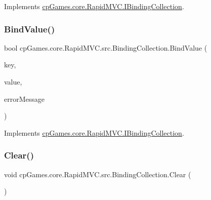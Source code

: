 Implements \mbox{\hyperlink{interfacecp_games_1_1core_1_1_rapid_m_v_c_1_1_i_binding_collection_afff4c2ad2ff9fb25c906864bc28f036f}{cp\+Games.\+core.\+Rapid\+M\+V\+C.\+I\+Binding\+Collection}}.

\mbox{\label{classcp_games_1_1core_1_1_rapid_m_v_c_1_1src_1_1_binding_collection_afb78998cb899e8a918b654505d521f7b}} 
\subsubsection{\texorpdfstring{BindValue()}{BindValue()}}
{\footnotesize\ttfamily bool cp\+Games.\+core.\+Rapid\+M\+V\+C.\+src.\+Binding\+Collection.\+Bind\+Value (\begin{DoxyParamCaption}\item[{\mbox{\hyperlink{interfacecp_games_1_1core_1_1_rapid_m_v_c_1_1_i_binding_key}{I\+Binding\+Key}}}]{key,  }\item[{object}]{value,  }\item[{out string}]{error\+Message }\end{DoxyParamCaption})}



Implements \mbox{\hyperlink{interfacecp_games_1_1core_1_1_rapid_m_v_c_1_1_i_binding_collection_a2a468c5570b780133763d9592e2c1cb5}{cp\+Games.\+core.\+Rapid\+M\+V\+C.\+I\+Binding\+Collection}}.

\mbox{\label{classcp_games_1_1core_1_1_rapid_m_v_c_1_1src_1_1_binding_collection_a7c3b2155a17bdb3f1d94a1e003fbb3c7}} 
\subsubsection{\texorpdfstring{Clear()}{Clear()}}
{\footnotesize\ttfamily void cp\+Games.\+core.\+Rapid\+M\+V\+C.\+src.\+Binding\+Collection.\+Clear (\begin{DoxyParamCaption}{ }\end{DoxyParamCaption})}



